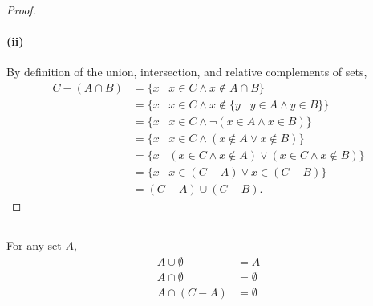\documentclass{report}
\begin{document}
\begin{proof}
  \paragraph{(ii)}%

    By definition of the union, intersection, and relative complements of sets,
      \begin{align*}
        C - (A \cap B)
          & = \{ x \mid x \in C \land x \not\in A \cap B \} \\
          & = \{ x \mid x \in C \land
                        x \not\in \{ y \mid y \in A \land y \in B \}\} \\
          & = \{ x \mid x \in C \land \neg(x \in A \land x \in B) \} \\
          & = \{ x \mid x \in C \land (x \not\in A \lor x \not\in B) \} \\
          & = \{ x \mid (x \in C \land x \not\in A) \lor
                        (x \in C \land x \not\in B) \} \\
          & = \{ x \mid x \in (C - A) \lor x \in (C - B) \} \\
          & = (C - A) \cup (C - B).
      \end{align*}

\end{proof}

\subsection{}%
\label{sub:identitives-involving-empty-set}

For any set $A$,
  \begin{align*}
    A \cup \emptyset & = A \\
    A \cap \emptyset & = \emptyset \\
    A \cap (C - A) & = \emptyset
  \end{align*}
\end{document}
